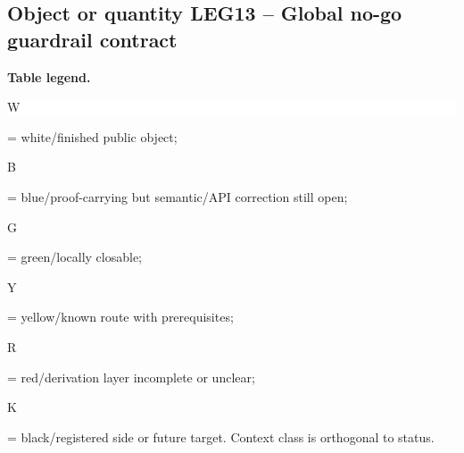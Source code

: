 \subsection*{Object or quantity LEG13 -- Global no-go guardrail contract}
\hypertarget{objproof:LEG13}{}
\par\smallskip\noindent\begin{minipage}{0.99\linewidth}\footnotesize\raggedright\textbf{Table legend.} \colorbox{white}{\strut W} = white/finished public object; \colorbox{cyan!20}{\strut B} = blue/proof-carrying but semantic/API correction still open; \colorbox{green!18}{\strut G} = green/locally closable; \colorbox{yellow!25}{\strut Y} = yellow/known route with prerequisites; \colorbox{red!20}{\strut R} = red/derivation layer incomplete or unclear; \colorbox{black!18}{\strut K} = black/registered side or future target. Context class is orthogonal to status.\end{minipage}\par\vspace{0.25em}
